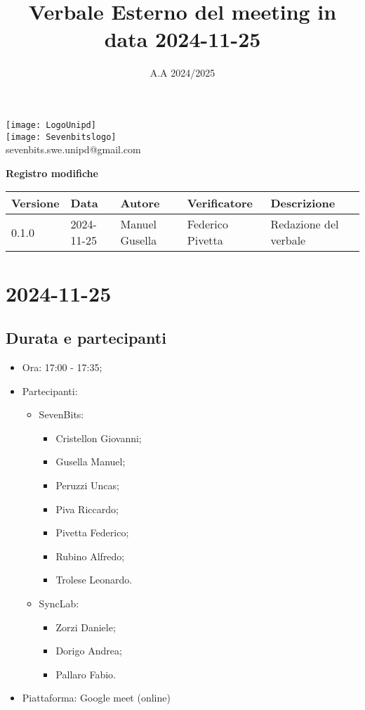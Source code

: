 \documentclass[12pt]{article}
\title{Verbale Esterno del meeting in data 2024-11-25}
\date{A.A 2024/2025}
\begin{document}
\maketitle
\begin{center}
\texttt{[image: LogoUnipd]}\\
\texttt{[image: Sevenbitslogo]}\\
sevenbits.swe.unipd@gmail.com\\
\vspace{2mm}

\textbf{Registro modifiche}\\
\vspace{2mm}
\begin{tabularx}{\textwidth}{|l|l|l|l|X|}
\hline
\textbf{Versione} & \textbf{Data} & \textbf{Autore} & \textbf{Verificatore} & \textbf{Descrizione} \\
\hline
0.1.0 & 2024-11-25 & Manuel Gusella & Federico Pivetta & Redazione del verbale\\
\hline

\end{tabularx}
\end{center}
\newpage
\tableofcontents
\newpage
\section{2024-11-25}
\subsection{Durata e partecipanti}
\begin{itemize}
\item Ora: 17:00 - 17:35;
\item Partecipanti: 	
	\begin{itemize}
        \item SevenBits:
        \begin{itemize}
        		\item Cristellon Giovanni;
			\item Gusella Manuel;
			\item Peruzzi Uncas;
			\item Piva Riccardo;
			\item Pivetta Federico;
			\item Rubino Alfredo;
			\item Trolese Leonardo.
		\end{itemize}
		\item SyncLab:
		\begin{itemize}
			\item Zorzi Daniele;
			\item Dorigo Andrea;
			\item Pallaro Fabio.
		\end{itemize}
	\end{itemize}
\item Piattaforma: Google meet (online)
\end{itemize}
\end{document}
